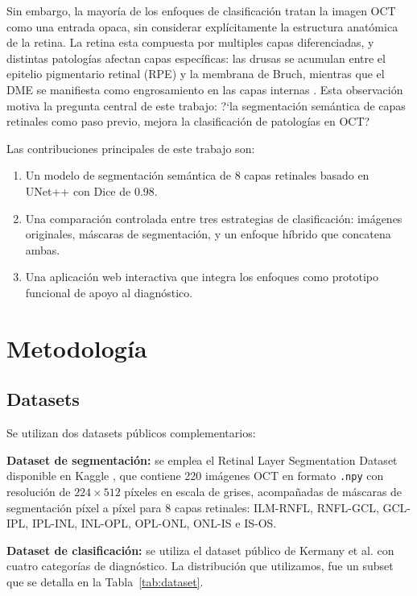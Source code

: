 \documentclass[journal, twocolumn]{IEEEtran}
\begin{document}
Sin embargo, la mayoría de los enfoques de clasificación tratan la imagen OCT como una entrada opaca, sin considerar explícitamente la estructura anatómica de la retina. La retina esta compuesta por multiples capas diferenciadas, y distintas patologías afectan capas específicas: las drusas se acumulan entre el epitelio pigmentario retinal (RPE) y la membrana de Bruch, mientras que el DME se manifiesta como engrosamiento en las capas internas \cite{huang1991}. Esta observación motiva la pregunta central de este trabajo: ?`la segmentación semántica de capas retinales como paso previo, mejora la clasificación de patologías en OCT?

Las contribuciones principales de este trabajo son:
\begin{enumerate}
	\item Un modelo de segmentación semántica de 8 capas retinales basado en UNet++ con Dice de 0.98.
	\item Una comparación controlada entre tres estrategias de clasificación: imágenes originales, máscaras de segmentación, y un enfoque híbrido que concatena ambas.
	\item Una aplicación web interactiva que integra los enfoques como prototipo funcional de apoyo al diagnóstico.
\end{enumerate}

\section{Metodología}

\subsection{Datasets}

Se utilizan dos datasets públicos complementarios:

\textbf{Dataset de segmentación:} se emplea el Retinal Layer Segmentation Dataset disponible en Kaggle  \cite{kaggle_platform}, que contiene 220 imágenes OCT en formato \texttt{.npy} con resolución de $224 \times 512$ píxeles en escala de grises, acompañadas de máscaras de segmentación píxel a píxel para 8 capas retinales: ILM-RNFL, RNFL-GCL, GCL-IPL, IPL-INL, INL-OPL, OPL-ONL, ONL-IS e IS-OS.

\textbf{Dataset de clasificación:} se utiliza el dataset público de Kermany et al. \cite{kermany2018} con cuatro categorías de diagnóstico. La distribución que utilizamos, fue un subset que se detalla en la Tabla~\ref{tab:dataset}.
\end{document}
